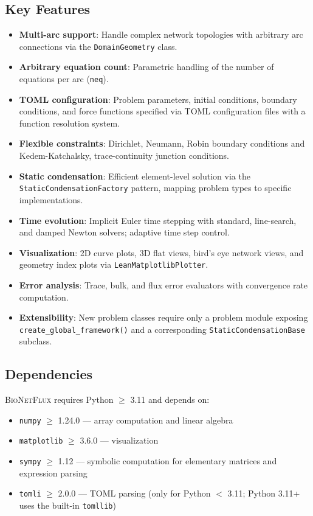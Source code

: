 \documentclass[11pt,a4paper]{article}
\newcommand{\code}[1]{\texttt{#1}}
\newcommand{\bionetflux}{\textsc{BioNetFlux}}
\begin{document}
\subsection{Key Features}

\begin{itemize}
    \item \textbf{Multi-arc support}: Handle complex network topologies with arbitrary arc connections via the \code{DomainGeometry} class.
    \item \textbf{Arbitrary equation count}: Parametric handling of the number of equations per arc (\code{neq}).
    \item \textbf{TOML configuration}: Problem parameters, initial conditions, boundary conditions, and force functions specified via TOML configuration files with a function resolution system.
    \item \textbf{Flexible constraints}: Dirichlet, Neumann, Robin boundary conditions and Kedem-Katchalsky, trace-continuity junction conditions.
    \item \textbf{Static condensation}: Efficient element-level solution via the \code{StaticCondensationFactory} pattern, mapping problem types to specific implementations.
    \item \textbf{Time evolution}: Implicit Euler time stepping with standard, line-search, and damped Newton solvers; adaptive time step control.
    \item \textbf{Visualization}: 2D curve plots, 3D flat views, bird's eye network views, and geometry index plots via \code{LeanMatplotlibPlotter}.
    \item \textbf{Error analysis}: Trace, bulk, and flux error evaluators with convergence rate computation.
    \item \textbf{Extensibility}: New problem classes require only a problem module exposing \code{create\_global\_framework()} and a corresponding \code{StaticCondensationBase} subclass.
\end{itemize}

\subsection{Dependencies}

\bionetflux{} requires Python $\ge$ 3.11 and depends on:
\begin{itemize}
	\item \code{numpy} $\ge$ 1.24.0 --- array computation and linear algebra
	\item \code{matplotlib} $\ge$ 3.6.0 --- visualization
	\item \code{sympy} $\ge$ 1.12 --- symbolic computation for elementary matrices and expression parsing
	\item \code{tomli} $\ge$ 2.0.0 --- TOML parsing (only for Python $<$ 3.11; Python 3.11+ uses the built-in \code{tomllib})
\end{itemize}
\end{document}
